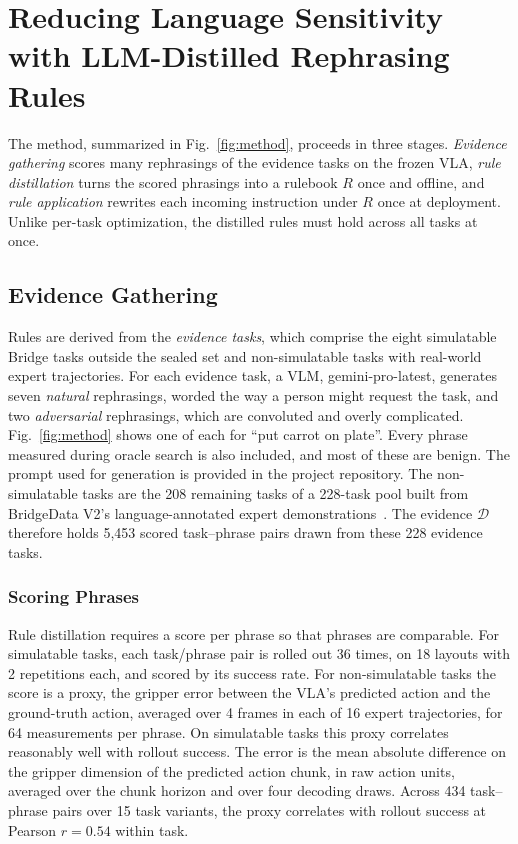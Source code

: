 \documentclass[letterpaper, 10 pt, conference]{ieeeconf} %
\begin{document}
\section{Reducing Language Sensitivity with LLM-Distilled Rephrasing Rules}

The method, summarized in Fig.~\ref{fig:method}, proceeds in three stages. \emph{Evidence gathering} scores many rephrasings of the evidence tasks on the frozen VLA, \emph{rule distillation} turns the scored phrasings into a rulebook $R$ once and offline, and \emph{rule application} rewrites each incoming instruction under $R$ once at deployment. Unlike per-task optimization, the distilled rules must hold across all tasks at once.

\subsection{Evidence Gathering}
\label{sec:evidence}

Rules are derived from the \emph{evidence tasks}, which comprise the eight simulatable Bridge tasks outside the sealed set and non-simulatable tasks with real-world expert trajectories. For each evidence task, a VLM, gemini-pro-latest, generates seven \emph{natural} rephrasings, worded the way a person might request the task, and two \emph{adversarial} rephrasings, which are convoluted and overly complicated. Fig.~\ref{fig:method} shows one of each for ``put carrot on plate''. Every phrase measured during oracle search is also included, and most of these are benign. The prompt used for generation is provided in the project repository.
The non-simulatable tasks are the 208 remaining tasks of a 228-task pool built from BridgeData V2's language-annotated expert demonstrations~\cite{bridge}. The evidence $\mathcal{D}$ therefore holds 5{,}453 scored task--phrase pairs drawn from these 228 evidence tasks.

\subsubsection{Scoring Phrases}

Rule distillation requires a score per phrase so that phrases are comparable. For simulatable tasks, each task/phrase pair is rolled out 36 times, on 18 layouts with 2 repetitions each, and scored by its success rate. For non-simulatable tasks the score is a proxy, the gripper error between the VLA's predicted action and the ground-truth action, averaged over 4 frames in each of 16 expert trajectories, for 64 measurements per phrase. On simulatable tasks this proxy correlates reasonably well with rollout success.
The error is the mean absolute difference on the gripper dimension of the predicted action chunk, in raw action units, averaged over the chunk horizon and over four decoding draws. Across 434 task--phrase pairs over 15 task variants, the proxy correlates with rollout success at Pearson $r = 0.54$ within task.
\end{document}
